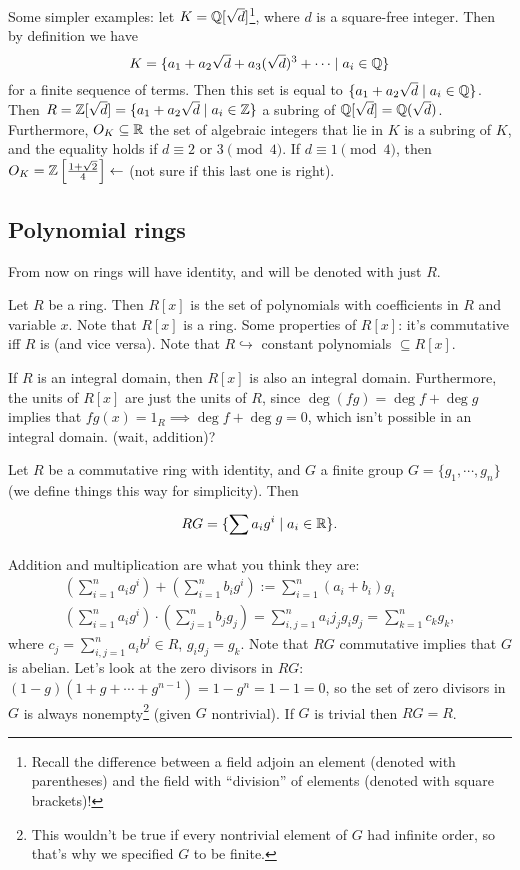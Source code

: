 \begin{example}
    Some simpler examples: let $K=\mathbb{Q}[\sqrt{d} ]$\footnote{Recall the difference between a field adjoin an element (denoted with parentheses) and the field with ``division'' of elements (denoted with square brackets)!}, where $ d$ is a square-free integer. Then by definition we have \[
        K=\{a_1+a_2\sqrt{d} +a_3(\sqrt{d} )^3+\cdots  \mid a_i \in \mathbb{Q}\} 
    \] for a finite sequence of terms. Then this set is equal to $\{a_1+a_2\sqrt{d}  \mid a_i \in \mathbb{Q}\} $. Then $R=\mathbb{Z}[\sqrt{d} ]=\{a_1+a_2\sqrt{d}  \mid a_i \in \mathbb{Z}\} $ a subring of $\mathbb{Q}[\sqrt{d} ]=\mathbb{Q}(\sqrt{d} )$. Furthermore, $O_K\subseteq \mathbb{R}$ the set of algebraic integers that lie in $K$ is a subring of $K$, and the equality holds if  $d\equiv 2$ or $3 \pmod 4$. If $d \equiv 1\pmod 4$, then $O_K= \mathbb{Z}\left[ \frac{1+\sqrt{2} }{4} \right] \leftarrow$ (not sure if this last one is right).
\end{example}
\subsection{Polynomial rings}
From now on rings will have identity, and will be denoted with just $R$.
\begin{definition}
    Let $R$ be a ring. Then $R[x]$ is the set of polynomials with coefficients in $R$ and variable $x$. Note that $R[x]$ is a ring. Some properties of $R[x]$: it's commutative iff $R$ is (and vice versa). Note that $R\hookrightarrow $ constant polynomials $\subseteq R[x]$.
\end{definition}
\begin{prop}
    If $R$ is an integral domain, then $R[x]$ is also an integral domain. Furthermore, the units of $R[x]$ are just the units of $R$, since $\deg(fg)=\deg  f + \deg g$ implies that $fg(x)=1_R \implies \deg f+\deg g=0$, which isn't possible in an integral domain. (wait, addition)?
\end{prop}
\orbreak
\begin{definition}
    Let $R$ be a commutative ring with identity, and $G$ a finite group $G=\{g_1,\cdots ,g_n \} $ (we define things this way for simplicity). Then \[
    RG=\{\sum_{}^{} a_i g^i  \mid a_i \in \mathbb{R}\} .
    \] Addition and multiplication are what you think they are:
    \begin{gather*}
        \left( \sum_{i=1}^{n} a_i g^i \right) +\left( \sum_{i=1}^{n} b_i g^i \right) := \sum_{i=1}^{n} (a_i +b_i )g_i \\
        \left( \sum_{i=1}^{n} a_i g^i \right) \cdot \left( \sum_{j=1}^{n} b_jg_j \right) =\sum_{i,j=1}^{n} a_i j_j g_i g_j=\sum_{k=1}^{n} c_kg_k,
    \end{gather*} where $c_j=\sum_{i,j=1}^{n} a_i b^j\in R$, $g_i g_j=g_k$. Note that $RG$ commutative implies that $G$ is abelian. Let's look at the zero divisors in $RG$: $(1-g)(1+g+\cdots +g^{n-1})=1-g^n =1-1=0$, so the set of zero divisors in $G$ is always nonempty\footnote{This wouldn't be true if every nontrivial element of $G$ had infinite order, so that's why we specified $G$ to be finite.} (given $G$ nontrivial). If $G$ is trivial then $RG=R$.
\end{definition}

